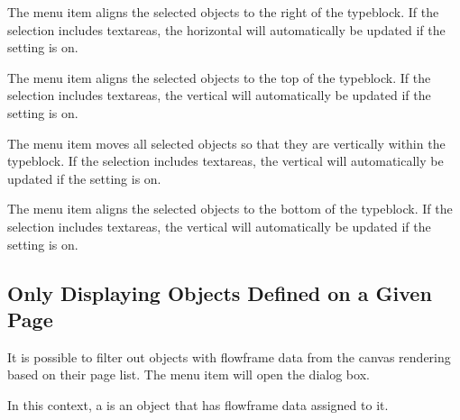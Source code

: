 
The  menu item aligns
the selected \glspl{object} to the right of the \gls{typeblock}. If
the selection includes \glspl{textarea}, the horizontal
 will automatically be updated if the
 setting is on.


The  menu item aligns
the selected \glspl{object} to the top of the \gls{typeblock}. If
the selection includes \glspl{textarea}, the vertical
 will automatically be updated if the
 setting is on.


The  menu item
moves all selected objects so that they are
 vertically within the \gls{typeblock}. If
the selection includes \glspl{textarea}, the vertical
 will automatically be updated if the
 setting is on.


The  menu item aligns
the selected \glspl{object} to the bottom of the \gls{typeblock}. If
the selection includes \glspl{textarea}, the vertical
 will automatically be updated if the
 setting is on.


\subsection{Only Displaying Objects Defined on a Given Page}\label{sec:displaypage}


It is possible to filter out \glspl{object} with \gls{flowframe}
data from the \gls{canvas} rendering based on their page list. The
 menu item will open the
 dialog box.


In this context, a  is an \gls{object} that has \gls{flowframe} data
assigned to it.

